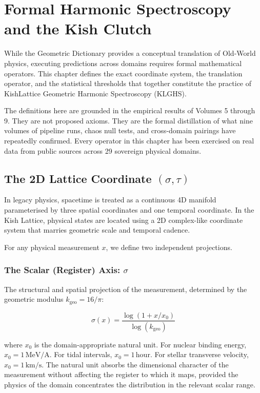 \documentclass[12pt,oneside]{book}
\begin{document}
\chapter{Formal Harmonic Spectroscopy and the Kish Clutch}

While the Geometric Dictionary provides a conceptual translation of Old-World physics,
executing predictions across domains requires formal mathematical operators. This chapter
defines the exact coordinate system, the translation operator, and the statistical
thresholds that together constitute the practice of KishLattice Geometric Harmonic
Spectroscopy (KLGHS).

The definitions here are grounded in the empirical results of Volumes 5 through 9.
They are not proposed axioms. They are the formal distillation of what nine volumes
of pipeline runs, chaos null tests, and cross-domain pairings have repeatedly confirmed.
Every operator in this chapter has been exercised on real data from public sources
across 29 sovereign physical domains.

\section{The 2D Lattice Coordinate $(\sigma, \tau)$}

In legacy physics, spacetime is treated as a continuous 4D manifold parameterised by
three spatial coordinates and one temporal coordinate. In the Kish Lattice, physical
states are located using a 2D complex-like coordinate system that marries geometric
scale and temporal cadence.

For any physical measurement $x$, we define two independent projections.

\subsection*{The Scalar (Register) Axis: $\sigma$}

The structural and spatial projection of the measurement, determined by the geometric
modulus $k_\text{geo} = 16/\pi$:

\begin{equation}
\sigma(x) = \frac{\log(1+x/x_0)}{\log(k_\text{geo})}
\label{eq:sigma_axis}
\end{equation}

where $x_0$ is the domain-appropriate natural unit. For nuclear binding energy,
$x_0 = 1\,\text{MeV/A}$. For tidal intervals, $x_0 = 1\,\text{hour}$. For
stellar transverse velocity, $x_0 = 1\,\text{km/s}$. The natural unit absorbs
the dimensional character of the measurement without affecting the register to
which it maps, provided the physics of the domain concentrates the distribution
in the relevant scalar range.
\end{document}
